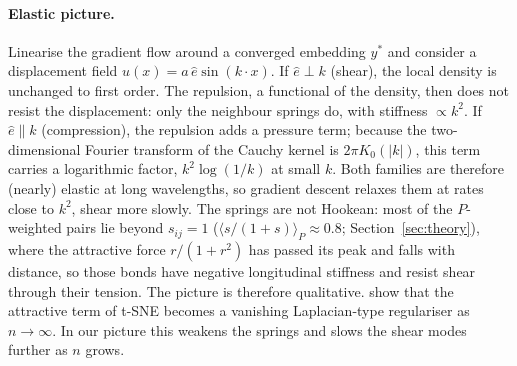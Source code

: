 \documentclass[11pt]{article}
\begin{document}
\paragraph{Elastic picture.} Linearise the gradient flow around a converged embedding $y^\ast$ and consider a
displacement field $u(x)=a\,\hat e\sin(k\cdot x)$. If $\hat e\perp k$ (shear), the local density is unchanged to
first order. The repulsion, a functional of the density, then does not resist the displacement: only the
neighbour springs do, with stiffness $\propto k^2$. If $\hat e\parallel k$ (compression), the repulsion adds
a pressure term; because the two-dimensional Fourier transform of the Cauchy kernel is $2\pi K_0(|k|)$, this term
carries a logarithmic factor, $k^2\log(1/k)$ at small $k$. Both families are therefore (nearly) elastic at long
wavelengths, so gradient descent relaxes them at rates close to $k^2$, shear more slowly. The springs are not
Hookean: most of the $P$-weighted pairs lie beyond $s_{ij}=1$ ($\langle s/(1+s)\rangle_P\approx0.8$;
Section~\ref{sec:theory}), where the attractive force $r/(1+r^2)$ has passed its peak and falls with distance, so
those bonds have negative longitudinal stiffness and resist shear through their tension. The picture is therefore
qualitative. \citet{murray2024limits} show that the attractive term of t-SNE becomes a vanishing Laplacian-type
regulariser as $n\to\infty$. In our picture this weakens the springs and slows the shear modes further as $n$
grows.
\end{document}
